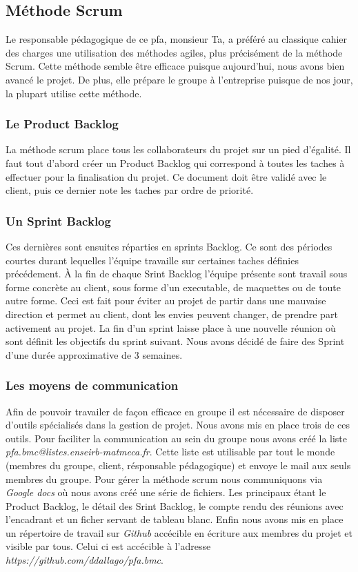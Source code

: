 \subsection{Méthode Scrum}
Le responsable pédagogique de ce pfa, monsieur Ta, a préféré au classique cahier des charges une utilisation des méthodes agiles, plus précisément de la méthode Scrum.
Cette méthode semble être efficace puisque aujourd'hui, nous avons bien avancé le projet. De plus, elle prépare le groupe à l'entreprise puisque de nos jour, la plupart utilise cette méthode.

\subsubsection*{Le Product Backlog}
La méthode scrum place tous les collaborateurs du projet sur un pied d'égalité. Il faut tout d'abord créer un Product Backlog qui correspond à toutes les taches à effectuer pour la finalisation du projet.
Ce document doit être validé avec le client, puis ce dernier note les taches par ordre de priorité.

\subsubsection*{Un Sprint Backlog}
Ces dernières sont ensuites réparties en sprints Backlog. Ce sont des périodes courtes durant lequelles l'équipe travaille sur certaines taches définies précédement. 
À la fin de chaque Srint Backlog l'équipe présente sont travail sous forme concrète au client, sous forme d'un executable, de maquettes ou de toute autre forme.
Ceci est fait pour éviter au projet de partir dans une mauvaise direction et permet au client, dont les envies peuvent changer, de prendre part activement au projet.
La fin d'un sprint laisse place à une nouvelle réunion où sont définit les objectifs du sprint suivant.
Nous avons décidé de faire des Sprint d'une durée approximative de 3 semaines.

\subsubsection*{Les moyens de communication}
Afin de pouvoir travailer de façon efficace en groupe il est nécessaire de disposer d'outils spécialisés dans la gestion de projet.
Nous avons mis en place trois de ces outils.
Pour faciliter la communication au sein du groupe nous avons créé la liste \textit{pfa.bmc@listes.enseirb-matmeca.fr}. Cette liste est utilisable par tout le monde (membres du groupe, client, résponsable pédagogique) et envoye le mail aux seuls membres du groupe.
Pour gérer la méthode scrum nous communiquons via \textit{Google docs} où nous avons créé une série de fichiers. Les principaux étant le Product Backlog, le détail des Srint Backlog, le compte rendu des réunions avec l'encadrant et un ficher servant de tableau blanc.
Enfin nous avons mis en place un répertoire de travail sur \textit{Github} accécible en écriture aux membres du projet et visible par tous. Celui ci est accécible à l'adresse \textit{https://github.com/ddallago/pfa.bmc}.

